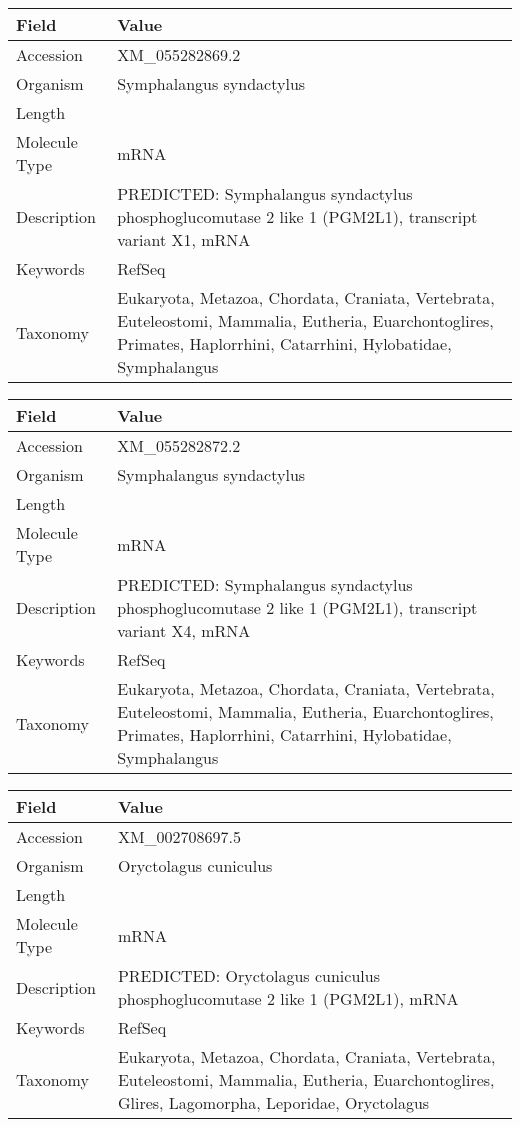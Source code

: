 \documentclass[10pt]{article}
\begin{document}
\vspace{1em}
{\footnotesize
\begin{longtable}{>{\raggedright\arraybackslash}p{4.5cm} >{\raggedright\arraybackslash}p{11.5cm}}
\textbf{Field} & \textbf{Value} \\
\hline
Accession & XM\_055282869.2 \\
Organism & Symphalangus syndactylus \\
Length & 8542 \\
Molecule Type & mRNA \\
Description & PREDICTED: Symphalangus syndactylus phosphoglucomutase 2 like 1 (PGM2L1), transcript variant X1, mRNA \\
Keywords & RefSeq \\
Taxonomy & Eukaryota, Metazoa, Chordata, Craniata, Vertebrata, Euteleostomi, Mammalia, Eutheria, Euarchontoglires, Primates, Haplorrhini, Catarrhini, Hylobatidae, Symphalangus \\
\end{longtable}
}

\vspace{1em}
{\footnotesize
\begin{longtable}{>{\raggedright\arraybackslash}p{4.5cm} >{\raggedright\arraybackslash}p{11.5cm}}
\textbf{Field} & \textbf{Value} \\
\hline
Accession & XM\_055282872.2 \\
Organism & Symphalangus syndactylus \\
Length & 8117 \\
Molecule Type & mRNA \\
Description & PREDICTED: Symphalangus syndactylus phosphoglucomutase 2 like 1 (PGM2L1), transcript variant X4, mRNA \\
Keywords & RefSeq \\
Taxonomy & Eukaryota, Metazoa, Chordata, Craniata, Vertebrata, Euteleostomi, Mammalia, Eutheria, Euarchontoglires, Primates, Haplorrhini, Catarrhini, Hylobatidae, Symphalangus \\
\end{longtable}
}

\vspace{1em}
{\footnotesize
\begin{longtable}{>{\raggedright\arraybackslash}p{4.5cm} >{\raggedright\arraybackslash}p{11.5cm}}
\textbf{Field} & \textbf{Value} \\
\hline
Accession & XM\_002708697.5 \\
Organism & Oryctolagus cuniculus \\
Length & 8422 \\
Molecule Type & mRNA \\
Description & PREDICTED: Oryctolagus cuniculus phosphoglucomutase 2 like 1 (PGM2L1), mRNA \\
Keywords & RefSeq \\
Taxonomy & Eukaryota, Metazoa, Chordata, Craniata, Vertebrata, Euteleostomi, Mammalia, Eutheria, Euarchontoglires, Glires, Lagomorpha, Leporidae, Oryctolagus \\
\end{longtable}
}
\end{document}
